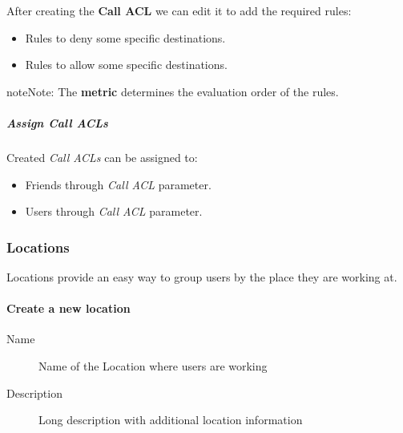 \documentclass[letterpaper,10pt,english]{sphinxmanual}
\begin{document}
After creating the \textbf{Call ACL} we can edit it to add the required rules:
\begin{itemize}
\item {} 
Rules to deny some specific destinations.

\item {} 
Rules to allow some specific destinations.

\end{itemize}

\begin{notice}{note}{Note:}
The \textbf{metric} determines the evaluation order of the rules.
\end{notice}


\subparagraph{Assign Call ACLs}
\label{administration_portal/client/vpbx/user_configuration/call_acls:assign-call-acls}
Created \emph{Call ACLs} can be assigned to:
\begin{itemize}
\item {} 
Friends through \emph{Call ACL} parameter.

\item {} 
Users through \emph{Call ACL} parameter.

\end{itemize}


\subsubsection{Locations}
\label{administration_portal/client/vpbx/user_configuration/locations::doc}\label{administration_portal/client/vpbx/user_configuration/locations:locations}
Locations provide an easy way to group users by the place they are working at.
\paragraph{Create a new location}
\begin{description}
\item[{Name}] \leavevmode{}\label{administration_portal/client/vpbx/user_configuration/locations:term-name}
Name of the Location where users are working

\item[{Description}] \leavevmode{}\label{administration_portal/client/vpbx/user_configuration/locations:term-description}
Long description with additional location information

\end{description}
\end{document}

